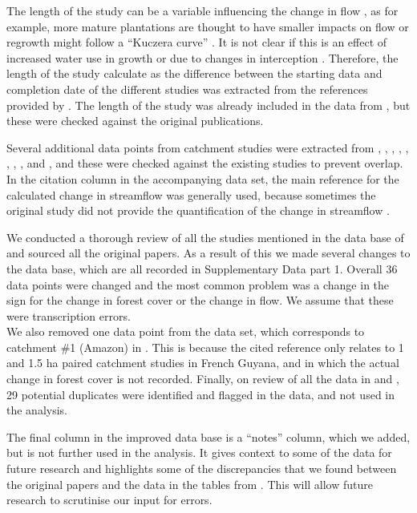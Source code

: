 \documentclass[]{elsarticle} %
\begin{document}
The length of the study can be a variable influencing the change in flow \citep[e.g.][]{jackson2005, filoso2017}, as for example, more mature plantations are thought to have smaller impacts on flow or regrowth might follow a ``Kuczera curve'' \citep{kuczera1987}. It is not clear if this is an effect of increased water use in growth \citep{vertessy2001} or due to changes in interception \citep{stoof2012}. Therefore, the length of the study calculate as the difference between the starting data and completion date of the different studies was extracted from the references provided by \citet{zhang2017}. The length of the study was already included in the data from \citet{filoso2017}, but these were checked against the original publications.

Several additional data points from catchment studies were extracted from \citet{almeida2016}, \citet{ferreto2020}, \citet{zhang2011}, \citet{zhao2010}, \citet{borg1988}, \citet{thornton2007}, \citet{zhou2010}, \citet{rodriguez2010}, \citet{ruprechtetal1991} and \citet{penaarancibia2012}, and these were checked against the existing studies to prevent overlap. In the citation column in the accompanying data set, the main reference for the calculated change in streamflow was generally used, because sometimes the original study did not provide the quantification of the change in streamflow \citep[i.e.~Table 6 in][]{zhang2011}.

We conducted a thorough review of all the studies mentioned in the data base of \citet{zhang2017} and sourced all the original papers. As a result of this we made several changes to the data base, which are all recorded in Supplementary Data part 1. Overall 36 data points were changed and the most common problem was a change in the sign for the change in forest cover or the change in flow. We assume that these were transcription errors.\\
We also removed one data point from the data set, which corresponds to catchment \#1 (Amazon) in \citet{zhang2017}. This is because the cited reference \citep{roche1981} only relates to 1 and 1.5 ha paired catchment studies in French Guyana, and in which the actual change in forest cover is not recorded. Finally, on review of all the data in \citet{zhang2017} and \citet{filoso2017}, 29 potential duplicates were identified and flagged in the data, and not used in the analysis.

The final column in the improved data base is a ``notes'' column, which we added, but is not further used in the analysis. It gives context to some of the data for future research and highlights some of the discrepancies that we found between the original papers and the data in the tables from \citet{zhang2017}. This will allow future research to scrutinise our input for errors.
\end{document}
